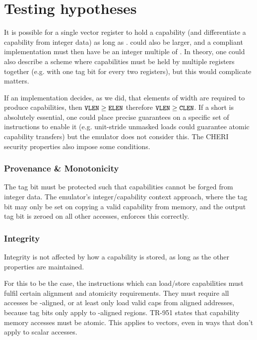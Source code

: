 \section{Testing hypotheses}

It is possible for a single vector register to hold a capability (and differentiate a capability from integer data) as long as .
 could also be larger, and a compliant implementation must then have  be an integer multiple of .
In theory, one could also describe a scheme where capabilities must be held by multiple registers together (e.g.  with one tag bit for every two registers), but this would complicate matters.

If an implementation decides, as we did, that elements of width  are required to produce capabilities, then ${\texttt{VLEN}} \ge {\texttt{ELEN}}$ therefore ${\texttt{VLEN}} \ge {\texttt{CLEN}}$.
If a short  is absolutely essential, one could place precise guarantees on a specific set of instructions to enable it (e.g.  unit-stride unmasked loads could guarantee atomic capability transfers) but the emulator does not consider this.
The CHERI security properties also impose some conditions.

\subsubsection*{Provenance \& Monotonicity}
The tag bit must be protected such that capabilities cannot be forged from integer data.
The emulator's integer/capability context approach, where the tag bit may only be set on copying a valid capability from memory, and the output tag bit is zeroed on all other accesses, enforces this correctly.

\subsubsection*{Integrity}
Integrity is not affected by how a capability is stored, as long as the other properties are maintained.

\label{chap:capinvec:hyp_load_store}
For this to be the case, the instructions which can load/store capabilities must fulfil certain alignment and atomicity requirements.
They must require all accesses be -aligned, or at least only load valid caps from aligned addresses, because tag bits only apply to -aligned regions.
TR-951 states that capability memory accesses must be atomic\cite[Section 11.3]{TR-951}.
This applies to vectors, even in ways that don't apply to scalar accesses.

